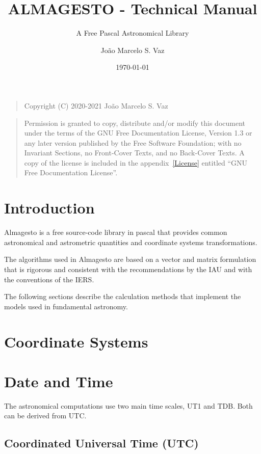 \documentclass[a4paper,11pt,bibliography=totoc]{scrreport}
\title{ALMAGESTO - Technical Manual}
\subtitle{A Free Pascal Astronomical Library}
\author{João Marcelo S. Vaz}
\date{\today}
\begin{document}
	
\maketitle
{}
\begin{quote}    
Copyright (C) 2020-2021 João Marcelo S. Vaz
\end{quote}
\begin{quote} 
Permission is granted to copy, distribute and/or modify this document under the terms of the GNU Free Documentation License, Version 1.3 or any later version published by the Free Software Foundation; with no Invariant Sections, no Front-Cover Texts, and no Back-Cover Texts. A copy of the license is included in the appendix~\ref{License} entitled ``GNU Free Documentation License''.
\end{quote}
	
\tableofcontents
\printglossary[type=\acronymtype,title=List of Abbreviations]

	
\clearpage
{}
\chapter{Introduction}\label{Introduction}

Almagesto is a free source-code library in pascal that provides common astronomical and astrometric quantities and coordinate systems transformations.

The algorithms used in Almagesto are based on a vector and matrix formulation that is rigorous and consistent with the recommendations by the \gls{IAU} and with the conventions of the \gls{IERS}.

The following sections describe the calculation methods that implement the models used in fundamental astronomy.

\chapter{Coordinate Systems}\label{CoordinateSystems}

\chapter{Date and Time}\label{TimeScales}

The astronomical computations use two main time scales, \gls{UT1} and \gls{TDB}. Both can be derived from \gls{UTC}.

\section{Coordinated Universal Time (UTC)}\label{UTC}
\end{document}
